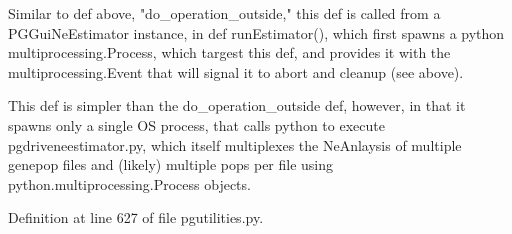 \begin{DoxyVerb}Similar to def above, "do_operation_outside," this def is called from a
PGGuiNeEstimator instance, in def runEstimator(), which first spawns
a python multiprocessing.Process, which targest this def, and provides
it with the multiprocessing.Event that will signal it to abort and cleanup
(see above).

This def is simpler than the do_operation_outside def, however, in that it
spawns only a single OS process, that calls python to execute pgdriveneestimator.py,
which itself multiplexes the NeAnlaysis of multiple genepop files and (likely) multiple
pops per file using python.multiprocessing.Process objects.
\end{DoxyVerb}
 

Definition at line 627 of file pgutilities.\+py.


